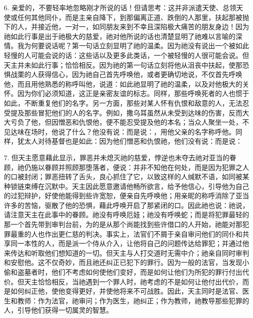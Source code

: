 6. 亲爱的，不要轻率地忽略刚才所说的话！但请思考：这并非派遣天使、总领天使或任何其他同仆，而是主亲自降下，到那偏离正道、跌倒的人那里，扶起那被抛下的人，并接近他，一对一，如同朋友来到不幸且深陷极大痛苦的朋友身边！因为祂如此行事是出于祂极大的慈爱，祂对他所说的话也清楚显明了祂难以言喻的深情。我为何要说话呢？第一句话立刻显明了祂的温柔。因为祂没有说出一个被如此轻慢的人可能会说的话：这些话以及更多此类话，一个被轻慢的人很可能会说。但天主并未如此行事；恰恰相反。因为祂的第一句话立刻将他从沮丧中扶起，使那恐惧战栗的人获得信心，因为祂自己首先呼唤他，或者更确切地说，不仅首先呼唤他，而且用他熟悉的称呼叫他，说道：如此祂显明了祂的温柔，以及对他极大的关怀。因为你们必须知道，这正是亲密友谊的标志。同样，那些呼唤死者的人也惯于如此，不断重复他们的名字。另一方面，那些对某人怀有仇恨和敌意的人，无法忍受提及那些冒犯他们的人的名字。例如，撒乌耳虽然从未受到达味的伤害，反而大大亏负了他，但因憎恶和仇恨他，便不能忍受提及他的本名；当众人聚坐一处，不见达味在场时，他说了什么？他没有说：而是说：，用他父亲的名字称呼他。同样，犹太人对待基督也是如此：因为他们憎恶和仇恨祂，他们没有说：而是说：\par

7. 但天主愿意藉此显示，罪恶并未熄灭祂的慈爱，悖逆也未夺去祂对亚当的眷顾，祂仍施以眷顾并照顾那堕落者，便说：并非不知他在何处，而是因为犯罪之人的口被封闭；罪恶扭转了舌头，良心抓住了它，以致这样的人缄默不语，如同被某种锁链束缚在沉默中。天主因此愿意邀请他畅所欲言，给予他信心，引导他为自己的过犯辩护，好使他能得到些许宽恕，便亲自先呼唤他；用亲昵的称呼消除了亚当许多的苦恼，驱散了他的恐惧，藉此呼唤开启了那紧闭的口。因此祂也说：祂说，请注意天主在此事中的眷顾。祂没有呼唤厄娃；祂没有呼唤蛇；而是将犯罪最轻的那一个首先带到审判台前，为的是从那个尚能找到些许借口的人开始，祂能对那犯罪最重的人也作出更仁慈的判决。事实上，法官们不屑于亲自审问他们的同仆和共享同一本性的人，而是派一个侍从介入，让他将自己的问题传达给罪犯；并通过他来传达和听取他们想知道的一切。但天主与人打交道时无需中介；祂亲自同时审判和安慰他。这不仅奇妙，而且祂还纠正已犯下的罪行。因为一般的法官，当发现小偷和盗墓者时，他们不考虑如何使他们变好，而是如何让他们为所犯的罪行付出代价。但天主恰恰相反，当祂遇到一个罪人时，祂考虑的不是如何让他付出代价，而是如何纠正他，使他变得更好，并使他将来不可战胜。因此，天主同时是法官、医生和教师：作为法官，祂审问；作为医生，祂纠正；作为教师，祂教导那些犯罪的人，引导他们获得一切属灵的智慧。\par

